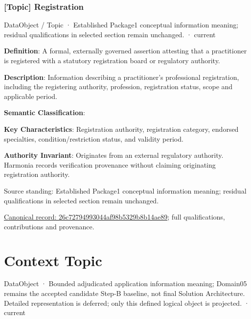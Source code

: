 \subsubsection{[Topic] Registration}

\label{element:26c72794993044af98b5329b8b14ae89}
{\small DataObject / Topic · Established Package1 conceptual information meaning; residual qualifications in selected section remain unchanged. · current}\par

\textbf{Definition}: A formal, externally governed assertion attesting that a practitioner is registered with a statutory registration board or regulatory authority.



\textbf{Description}: Information describing a practitioner's professional registration, including the registering authority, profession, registration status, scope and applicable period.



\textbf{Semantic Classification}: \texttt{}



\textbf{Key Characteristics}: Registration authority, registration category, endorsed specialties, condition/restriction status, and validity period.



\textbf{Authority Invariant}: Originates from an external regulatory authority. Harmonia records verification provenance without claiming originating registration authority.



Source standing: Established Package1 conceptual information meaning; residual qualifications in selected section remain unchanged.


{\footnotesize \href{../../../../continuum/application/data-object/topic/26c72794993044af98b5329b8b14ae89.md}{Canonical record: 26c72794993044af98b5329b8b14ae89}; full qualifications, contributions and provenance.}\par
\section{Context Topic}

\label{element:76ded4866bf443dabc0849d68b215690}
{\small DataObject · Bounded adjudicated application information meaning; Domain05 remains the accepted candidate Step-B baseline, not final Solution Architecture. Detailed representation is deferred; only this defined logical object is projected. · current}\par


